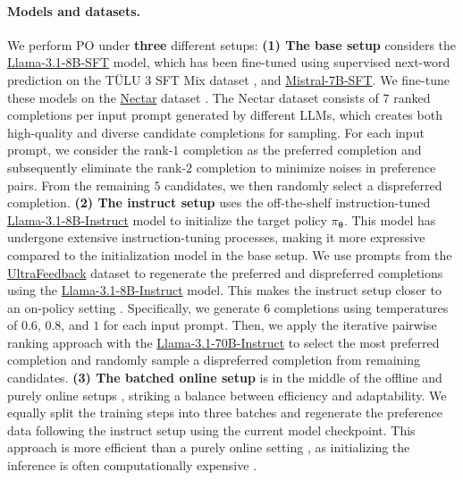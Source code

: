 \paragraph{Models and datasets.}
We perform PO under \textbf{three} different setups: \textbf{ (1) The base setup} considers the
\href{https://huggingface.co/allenai/Llama-3.1-Tulu-3-8B-SFT}{Llama-3.1-8B-SFT} model, which has been fine-tuned using supervised next-word prediction on the TÜLU 3 SFT Mix dataset \citep{lambert2024t},
and {\href{https://huggingface.co/HuggingFaceH4/mistral-7b-sft-beta}{Mistral-7B-SFT}}.
We fine-tune these models on the \href{https://huggingface.co/datasets/berkeley-nest/Nectar}{Nectar} dataset \citep{zhu2023starling}.
The Nectar dataset consists of $7$ ranked completions per input prompt generated by different LLMs,
which creates both high-quality and diverse candidate completions for sampling.
For each input prompt,
we consider the rank-$1$ completion as the preferred completion and subsequently eliminate the rank-$2$ completion to minimize noises in preference pairs. 
From the remaining $5$ candidates, we then randomly select a dispreferred completion.
\textbf{ (2) The instruct setup} uses the off-the-shelf instruction-tuned
\href{https://huggingface.co/meta-llama/Llama-3.1-8B-Instruct}{Llama-3.1-8B-Instruct} model \citep{dubey2024llama} to initialize the target policy $\pi_{\boldsymbol\theta}$.
This model has undergone extensive instruction-tuning processes, making it more expressive compared to the initialization model in the base setup.
We use prompts from the \href{https://huggingface.co/datasets/HuggingFaceH4/ultrafeedback_binarized}{UltraFeedback} dataset \citep{cui2023ultrafeedback} to regenerate the preferred and dispreferred completions using the \href{https://huggingface.co/meta-llama/Llama-3.1-8B-Instruct}{Llama-3.1-8B-Instruct} model.
This makes the instruct setup closer to an on-policy setting \citep{tang2024understanding}.
Specifically,
we generate $6$ completions using temperatures of $0.6$, $0.8$, and $1$ for each input prompt.
Then, we apply the iterative pairwise ranking approach \citep{chen2024towards} with the
\href{https://huggingface.co/meta-llama/Llama-3.1-70B-Instruct}{Llama-3.1-70B-Instruct} to select the most preferred completion and randomly sample a dispreferred completion from remaining candidates.
\textbf{ (3) The batched online setup} is in the middle of the offline and purely online setups \citep{schulman2017proximal, lambert2024t}, striking a balance between efficiency and adaptability.
We equally split the training steps into three batches and regenerate the preference data following the instruct setup using the current model checkpoint.
This approach is more efficient than a purely online setting \citep{qi2024online}, as initializing the inference  is often computationally expensive \citep{kwon2023efficient}.

